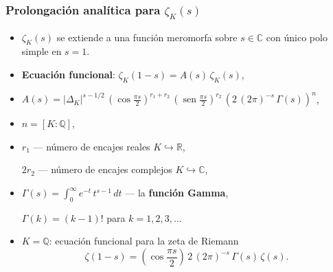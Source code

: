 \documentclass[handout]{beamer}
\newcommand{\QQ}{\mathbb{Q}}
\newcommand{\CC}{\mathbb{C}}
\newcommand{\RR}{\mathbb{R}}
\renewcommand{\sin}{\operatorname{sen}}
\begin{document}

\begin{frame}
  \frametitle{Prolongación analítica para $\zeta_K (s)$}

  \begin{itemize}
  \item<1-> $\zeta_K (s)$ se extiende a una función meromorfa sobre $s \in \CC$ con
    único polo simple en $s = 1$.

  \item<2-> \textbf{Ecuación funcional}: $\zeta_K (1-s) = A(s)\,\zeta_K (s)$,

  \item<3-> $A (s) = |\Delta_K|^{s - 1/2}\,\left(\cos\frac{\pi s}{2}\right)^{r_1+r_2}\,\left(\sin\frac{\pi s}{2}\right)^{r_2}\,\left(2\,(2\pi)^{-s}\,\Gamma (s)\right)^n$,

  \item<4-> $n = [K : \QQ]$,

  \item<5-> $r_1$ --- número de encajes reales $K \hookrightarrow \RR$,

    $2 r_2$ --- número de encajes complejos $K \hookrightarrow \CC$,

  \item<6-> $\Gamma (s) = \int_0^\infty e^{-t}\,t^{s-1}\,dt$ --- la \textbf{función Gamma},

    $\Gamma (k) = (k-1)!$ para $k = 1,2,3,\ldots$
    
  \item<7-> $K = \QQ$: ecuación funcional para la zeta de Riemann
    $$\zeta (1-s) = \left(\cos\frac{\pi s}{2}\right)\,2\,(2\pi)^{-s}\,\Gamma (s)\,\zeta (s).$$
  \end{itemize}
\end{frame}

\end{document}
